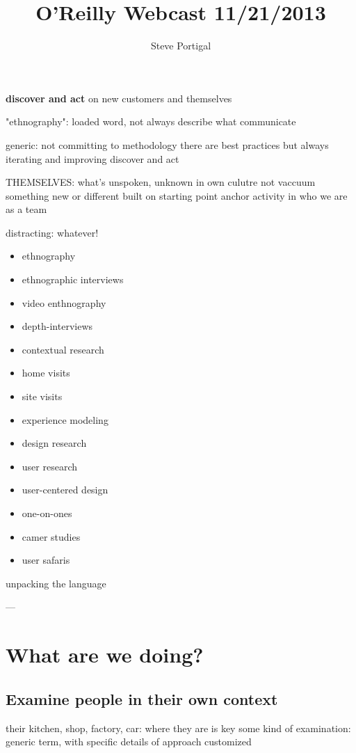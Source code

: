\documentclass{article}
\author{Steve Portigal}
\title{O'Reilly Webcast 11/21/2013}
\begin{document}
\maketitle

{\bf discover and act} on new customers and themselves

"ethnography": loaded word, not always describe what communicate

generic: not committing to methodology
there are best practices but always iterating and improving
discover and act

THEMSELVES: what's unspoken, unknown in own culutre
not vaccuum
something new or different built on starting point
anchor activity in who we are as a team

distracting:
whatever!

\begin{framed}
\begin{itemize}
\item{ethnography}
\item{ethnographic interviews}
\item{video enthnography}
\item{depth-interviews}
\item{contextual research}
\item{home visits}
\item{site visits}
\item{experience modeling}
\item{design research}
\item{user research}
\item{user-centered design}
\item{one-on-ones}
\item{camer studies}
\item{user safaris}
\end{itemize}
\end{framed}

unpacking the language

---

\section{What are we doing?}
\subsection{Examine people in their own context}

their kitchen, shop, factory, car: where they are is key
some kind of examination: generic term, with specific details of approach customized
\end{document}
